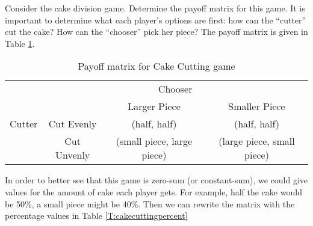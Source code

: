\begin{example}\label{E:cakecutting2} Consider the cake division game. Determine the payoff matrix for this game. It is important to determine what each player's options are first: how can the ``cutter'' cut the cake? How can the ``chooser''  pick her piece? The payoff matrix is given in Table \ref{T:cakecutting}.




\begin{table}[h]
\centering

\begin{tabular}{cccc}
                      & \multicolumn{3}{c}{Chooser}                                                  \\ \cline{2-4} 
\multicolumn{1}{l|}{} & \multicolumn{1}{l|}{} & \multicolumn{1}{c|}{Larger Piece} & \multicolumn{1}{c|}{Smaller Piece} \\ \cline{2-4} 
\multicolumn{1}{l|}{Cutter} & \multicolumn{1}{c|}{Cut Evenly} & \multicolumn{1}{c|}{(half, half)} & \multicolumn{1}{c|}{(half, half)} \\ \cline{2-4} 
\multicolumn{1}{l|}{} & \multicolumn{1}{c|}{Cut Unvenly} & \multicolumn{1}{c|}{(small piece, large piece)} & \multicolumn{1}{c|}{(large piece, small piece)} \\ \cline{2-4} 
\end{tabular}
\caption{Payoff matrix for Cake Cutting game}
\label{T:cakecutting}
\end{table}


In order to better see that this game is zero-sum (or constant-sum), we could give values for the amount of cake each player gets. For example, half the cake would be 50\%, a small piece might be 40\%. Then we can rewrite the matrix with the percentage values in Table \ref{T:cakecuttingpercent}



\end{example}
